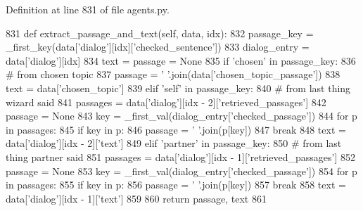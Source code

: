 Definition at line 831 of file agents.\+py.


\begin{DoxyCode}
831     \textcolor{keyword}{def }extract\_passage\_and\_text(self, data, idx):
832         passage\_key = \_first\_key(data[\textcolor{stringliteral}{'dialog'}][idx][\textcolor{stringliteral}{'checked\_sentence'}])
833         dialog\_entry = data[\textcolor{stringliteral}{'dialog'}][idx]
834         text = passage = \textcolor{keywordtype}{None}
835         \textcolor{keywordflow}{if} \textcolor{stringliteral}{'chosen'} \textcolor{keywordflow}{in} passage\_key:
836             \textcolor{comment}{# from chosen topic}
837             passage = \textcolor{stringliteral}{' '}.join(data[\textcolor{stringliteral}{'chosen\_topic\_passage'}])
838             text = data[\textcolor{stringliteral}{'chosen\_topic'}]
839         \textcolor{keywordflow}{elif} \textcolor{stringliteral}{'self'} \textcolor{keywordflow}{in} passage\_key:
840             \textcolor{comment}{# from last thing wizard said}
841             passages = data[\textcolor{stringliteral}{'dialog'}][idx - 2][\textcolor{stringliteral}{'retrieved\_passages'}]
842             passage = \textcolor{keywordtype}{None}
843             key = \_first\_val(dialog\_entry[\textcolor{stringliteral}{'checked\_passage'}])
844             \textcolor{keywordflow}{for} p \textcolor{keywordflow}{in} passages:
845                 \textcolor{keywordflow}{if} key \textcolor{keywordflow}{in} p:
846                     passage = \textcolor{stringliteral}{' '}.join(p[key])
847                     \textcolor{keywordflow}{break}
848             text = data[\textcolor{stringliteral}{'dialog'}][idx - 2][\textcolor{stringliteral}{'text'}]
849         \textcolor{keywordflow}{elif} \textcolor{stringliteral}{'partner'} \textcolor{keywordflow}{in} passage\_key:
850             \textcolor{comment}{# from last thing partner said}
851             passages = data[\textcolor{stringliteral}{'dialog'}][idx - 1][\textcolor{stringliteral}{'retrieved\_passages'}]
852             passage = \textcolor{keywordtype}{None}
853             key = \_first\_val(dialog\_entry[\textcolor{stringliteral}{'checked\_passage'}])
854             \textcolor{keywordflow}{for} p \textcolor{keywordflow}{in} passages:
855                 \textcolor{keywordflow}{if} key \textcolor{keywordflow}{in} p:
856                     passage = \textcolor{stringliteral}{' '}.join(p[key])
857                     \textcolor{keywordflow}{break}
858             text = data[\textcolor{stringliteral}{'dialog'}][idx - 1][\textcolor{stringliteral}{'text'}]
859 
860         \textcolor{keywordflow}{return} passage, text
861 
\end{DoxyCode}
